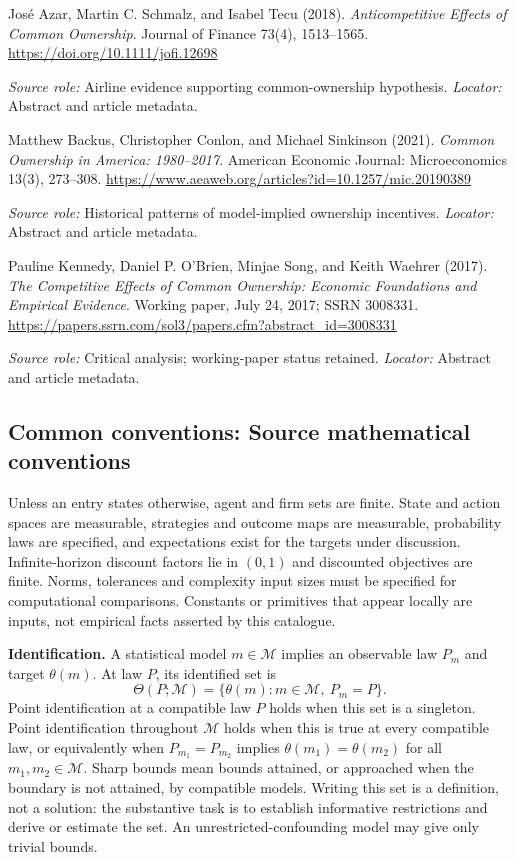 \documentclass[11pt,a4paper]{article}
\begin{document}
\begin{enumerate}[label={[S\arabic*]},leftmargin=*]

\item José Azar, Martin C. Schmalz, and Isabel Tecu (2018). \emph{Anticompetitive Effects of Common Ownership}. Journal of Finance 73(4), 1513--1565. \url{https://doi.org/10.1111/jofi.12698}\par \textit{Source role:} Airline evidence supporting common-ownership hypothesis. \textit{Locator:} Abstract and article metadata.

\item Matthew Backus, Christopher Conlon, and Michael Sinkinson (2021). \emph{Common Ownership in America: 1980--2017}. American Economic Journal: Microeconomics 13(3), 273--308. \url{https://www.aeaweb.org/articles?id=10.1257/mic.20190389}\par \textit{Source role:} Historical patterns of model-implied ownership incentives. \textit{Locator:} Abstract and article metadata.

\item Pauline Kennedy, Daniel P. O'Brien, Minjae Song, and Keith Waehrer (2017). \emph{The Competitive Effects of Common Ownership: Economic Foundations and Empirical Evidence}. Working paper, July 24, 2017; SSRN 3008331. \url{https://papers.ssrn.com/sol3/papers.cfm?abstract_id=3008331}\par \textit{Source role:} Critical analysis; working-paper status retained. \textit{Locator:} Abstract and article metadata.

\end{enumerate}

\subsection*{Common conventions: Source mathematical conventions}

Unless an entry states otherwise, agent and firm sets are finite. State and action spaces are measurable, strategies and outcome maps are measurable, probability laws are specified, and expectations exist for the targets under discussion. Infinite-horizon discount factors lie in $(0,1)$ and discounted objectives are finite. Norms, tolerances and complexity input sizes must be specified for computational comparisons. Constants or primitives that appear locally are inputs, not empirical facts asserted by this catalogue.

\textbf{Identification.} A statistical model $m\in\mathcal M$ implies an observable law $P_m$ and target $\theta(m)$. At law $P$, its identified set is
\[
\Theta(P;\mathcal M)=\{\theta(m):m\in\mathcal M,\ P_m=P\}.
\]
Point identification at a compatible law $P$ holds when this set is a singleton. Point identification throughout $\mathcal M$ holds when this is true at every compatible law, or equivalently when $P_{m_1}=P_{m_2}$ implies $\theta(m_1)=\theta(m_2)$ for all $m_1,m_2\in\mathcal M$. Sharp bounds mean bounds attained, or approached when the boundary is not attained, by compatible models. Writing this set is a definition, not a solution: the substantive task is to establish informative restrictions and derive or estimate the set. An unrestricted-confounding model may give only trivial bounds.
\end{document}
